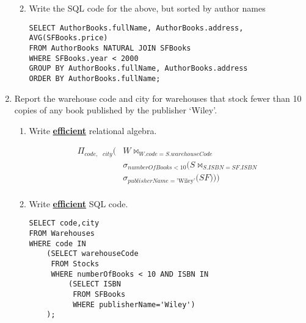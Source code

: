 \documentclass[12pt]{article}
\begin{document}
\begin{enumerate}
\begin{enumerate}
\begin{tcolorbox}
      \begin{center}
        \end{center}
      \end{tcolorbox}
  \item Write the SQL code for the above, but sorted by author names
\begin{verbatim}
SELECT AuthorBooks.fullName, AuthorBooks.address, AVG(SFBooks.price)
FROM AuthorBooks NATURAL JOIN SFBooks
WHERE SFBooks.year < 2000
GROUP BY AuthorBooks.fullName, AuthorBooks.address
ORDER BY AuthorBooks.fullName;
\end{verbatim}
  \end{enumerate}
\item Report the warehouse code and city for warehouses that stock fewer than 10 copies of any book published by the publisher ‘Wiley’.
  \begin{enumerate}
  \item Write \textbf{\underline{efficient}} relational algebra.
    \begin{tcolorbox}
      \begin{center}
        \begin{align*}
          \Pi_{code,\text{ }city}\Bigg(&W \bowtie_{W.code=S.warehouseCode} \\ 
                                       &\sigma_{numberOfBooks < 10} \Big(S \bowtie_{S.ISBN=SF.ISBN} \\ 
                                       &\sigma_{publisherName=\text{'Wiley'}}\big(SF\big)\Big)\Bigg) \\
        \end{align*}
      \end{center}
    \end{tcolorbox}
          
  \item Write \textbf{\underline{efficient}} SQL code.
\begin{verbatim}
SELECT code,city
FROM Warehouses
WHERE code IN 
    (SELECT warehouseCode
     FROM Stocks
     WHERE numberOfBooks < 10 AND ISBN IN
         (SELECT ISBN
          FROM SFBooks
          WHERE publisherName='Wiley')
    );
\end{verbatim}
  \end{enumerate}
    
\end{enumerate}
\end{document}
